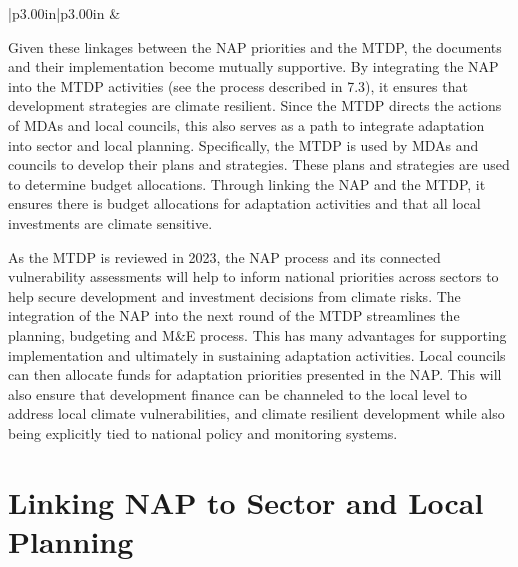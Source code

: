 \documentclass[
]{book}
\begin{document}
\begin{longtable}[c]{|p{3.00in}|p{3.00in}}
 &  \\

\noalign{\global\setlength{\arrayrulewidth}{1pt}}

\end{longtable}

Given these linkages between the NAP priorities and the MTDP, the documents and their implementation become mutually supportive. By integrating the NAP into the MTDP activities (see the process described in 7.3), it ensures that development strategies are climate resilient. Since the MTDP directs the actions of MDAs and local councils, this also serves as a path to integrate adaptation into sector and local planning. Specifically, the MTDP is used by MDAs and councils to develop their plans and strategies. These plans and strategies are used to determine budget allocations. Through linking the NAP and the MTDP, it ensures there is budget allocations for adaptation activities and that all local investments are climate sensitive.

As the MTDP is reviewed in 2023, the NAP process and its connected vulnerability assessments will help to inform national priorities across sectors to help secure development and investment decisions from climate risks. The integration of the NAP into the next round of the MTDP streamlines the planning, budgeting and M\&E process. This has many advantages for supporting implementation and ultimately in sustaining adaptation activities. Local councils can then allocate funds for adaptation priorities presented in the NAP. This will also ensure that development finance can be channeled to the local level to address local climate vulnerabilities, and climate resilient development while also being explicitly tied to national policy and monitoring systems.

\hypertarget{linking-nap-to-sector-and-local-planning}{%
\section{Linking NAP to Sector and Local Planning}\label{linking-nap-to-sector-and-local-planning}}
\end{document}
